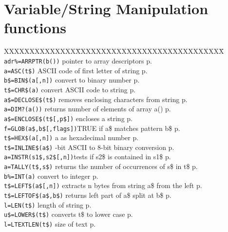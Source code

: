 \section{Variable/String Manipulation functions}
\begin{tabbing}
XXXXXXXXXXXXXX\=XXXXXXXXXXXXXXXXXXXXXXXXXXXXX\=\kill\\
\verb|adr%=ARRPTR(b())|  	\> pointer to array descriptors\> p.\pageref{ARRPTR}\\
\verb|a=ASC(t$)|	\> ASCII code of first letter of string\> p.\pageref{ASC}\\
\verb|b$=BIN$(a[,n])|  	\> convert to binary number\> p.\pageref{BINS}\\
\verb|t$=CHR$(a)|	\> convert ASCII code to string\> p.\pageref{CHRS}\\
\verb|a$=DECLOSE$(t$)| \> removes enclosing characters from string\> p.\pageref{DECLOSES}\\
\verb|a=DIM?(a())|	\>  returns number of elements of array a()\> p.\pageref{DIMf}\\
\verb|a$=ENCLOSE$(t$[,p$])| \> encloses a string\> p.\pageref{ENCLOSES}\\
\verb|f=GLOB(a$,b$[,flags])|\>TRUE if a\$ matches pattern b\$\> p.\pageref{GLOB}\\
\verb|t$=HEX$(a[,n])|  	\>a as hexadecimal number\> p.\pageref{HEXS}\\
\verb|t$=INLINE$(a$)|  	-bit ASCII to 8-bit binary conversion\> p.\pageref{INLINES}\\
\verb|a=INSTR(s1$,s2$[,n])|\>tests if s2\$ is contained in s1\$\> p.\pageref{INSTR}\\
\verb|a=TALLY(t$,s$)|\> returns the number of occurrences of s\$ in t\$\> p.\pageref{TALLY}\\
\verb|b%=INT(a)|		\> convert to integer\> p.\pageref{INT}\\
\verb|t$=LEFT$(a$[,n])|  	\>extracts n bytes from string a\$ from the left\> p.\pageref{LEFTS}\\
\verb|t$=LEFTOF$(a$,b$)| \>  returns left part of a\$ split at b\$\> p.\pageref{LEFTOFS}\\
\verb|l=LEN(t$)|	\>length of string\> p.\pageref{LEN}\\
\verb|u$=LOWER$(t$)| \>	     converts t\$ to lower case\> p.\pageref{LOWERS}\\
\verb|l=LTEXTLEN(t$)|	\>size of text\> p.\pageref{LTEXTLEN}\\

\end{tabbing}
